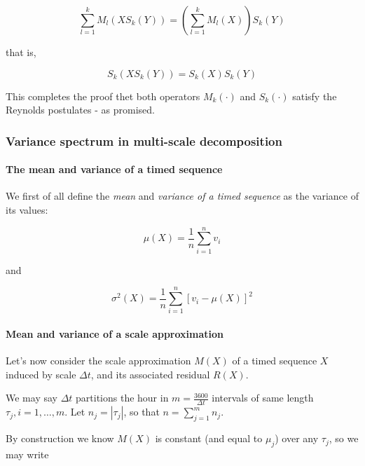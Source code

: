 \documentclass[a4paper,10pt]{book}
\begin{document}
\begin{equation}
	\sum_{l=1}^{k} M_{l}(X S_{k}(Y)) = \left(\sum_{l=1}^{k} M_{l}(X)\right) S_{k}(Y)
\end{equation}

\noindent that is,

\begin{equation}\label{eq:Fourth Reynolds postulate on multiple scale}
	S_{k}(X S_{k}(Y)) = S_{k}(X) S_{k}(Y)
\end{equation}

This completes the proof thet both operators $M_{k}(\cdot)$ and $S_{k}(\cdot)$ satisfy the Reynolds postulates - as promised.

\subsubsection{Variance spectrum in multi-scale decomposition}
\paragraph{The mean and variance of a timed sequence}

We first of all define the \emph{mean} and \emph{variance of a timed sequence} as the variance of its values:

\begin{equation}\label{eq:Mean of a timed sequence}
	\mu(X) = \frac{1}{n} \sum_{i=1}^{n} v_{i}
\end{equation}

\noindent and

\begin{equation}\label{eq:Variance of a timed sequence}
	\sigma^{2}(X) = \frac{1}{n} \sum_{i=1}^{n} \left[v_{i} - \mu(X)\right]^{2}
\end{equation}


\paragraph{Mean and variance of a scale approximation}

Let's now consider the scale approximation $M(X)$ of a timed sequence $X$ induced by scale $\Delta t$, and its associated residual $R(X)$.

We may say $\Delta t$ partitions the hour in $m = \frac{3600}{\Delta t}$ intervals of same length $\tau_{j}, i=1, \ldots,m$. Let $n_{j} = |\tau_{j}|$, so that $n = \sum_{j=1}^{m} n_{j}$.

By construction we know $M(X)$ is constant (and equal to $\mu_{j}$) over any $\tau_{j}$, so we may write
\end{document}
